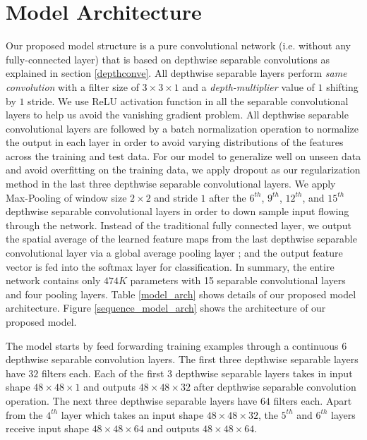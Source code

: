 \documentclass[master]{thesis-uestc}
\begin{document}
\section{Model Architecture}
Our proposed model structure is a pure convolutional network (i.e. without any fully-connected layer) that is based on depthwise separable convolutions as explained in section \ref{depthconve}. All depthwise separable layers perform \textit{same convolution} with a filter size of $3 \times 3 \times 1$ and a \textit{depth-multiplier} value of $1$ shifting by $1$ stride. We use ReLU activation function in all the separable convolutional layers to help us avoid the vanishing gradient problem. All depthwise separable convolutional layers are followed by a batch normalization operation to normalize the output in each layer in order to avoid varying distributions of the features across the training and test data. For our model to generalize well on unseen data and avoid overfitting on the training data, we apply dropout as our regularization method in the last three depthwise separable convolutional layers. We apply Max-Pooling of window size $2 \times 2$ and stride $1$ after the $6^{th}$, $9^{th}$, $12^{th}$, and $15^{th}$ depthwise separable convolutional layers in order to down sample input flowing through the network. Instead of the traditional fully connected layer, we output the spatial average of the learned feature maps from the last depthwise separable convolutional layer via a global average pooling layer ; and the output feature vector is fed into the softmax layer for classification.  In summary, the entire network contains only $474K$ parameters with 15 separable convolutional layers and four pooling layers. Table \ref{model_arch} shows details of our proposed model architecture. Figure \ref{sequence_model_arch} shows the architecture of our proposed model.

The model starts by feed forwarding training examples through a continuous $6$ depthwise separable convolution layers. The first three depthwise separable layers have $32$ filters each. Each of the first $3$ depthwise separable layers takes in input shape $48 \times 48 \times 1$ and outputs $48 \times 48 \times 32$ after depthwise separable convolution operation. The next three depthwise separable layers have $64$ filters each. Apart from the $4^{th}$ layer which takes an input shape $48 \times 48 \times 32$, the $5^{th}$ and $6^{th}$ layers receive input shape $48 \times 48 \times 64$ and outputs $48 \times 48 \times 64$.
\end{document}
